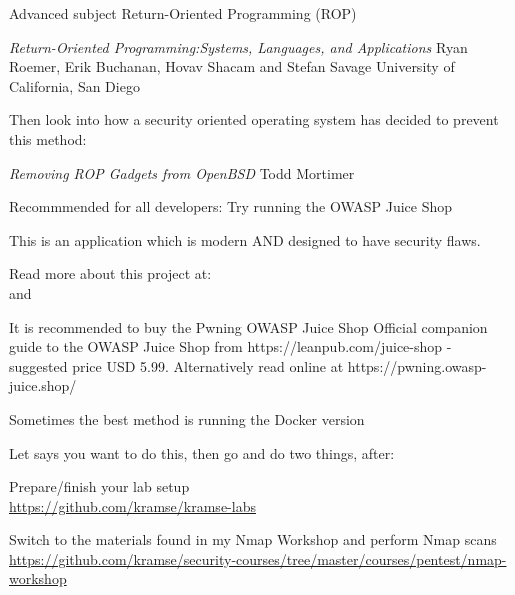 \documentclass[Screen16to9,17pt]{foils}
\begin{document}
\begin{list1}
\item Advanced subject Return-Oriented Programming (ROP)
\item \emph{Return-Oriented Programming:Systems, Languages, and Applications}
Ryan Roemer, Erik Buchanan, Hovav Shacam and Stefan Savage University of California, San Diego\\
\item Then look into how a security oriented operating system has decided to prevent this method:
\item \emph{Removing ROP Gadgets from OpenBSD}
Todd Mortimer\\
\end{list1}


\begin{list1}
\item Recommmended for all developers: Try running the OWASP Juice Shop
\item This is an application which is modern AND designed to have security flaws.
\item Read more about this project at:\\
 and\\ 
\item It is recommended to buy the Pwning OWASP Juice Shop Official companion guide to the OWASP Juice Shop from https://leanpub.com/juice-shop - suggested price USD 5.99. Alternatively read online at https://pwning.owasp-juice.shop/
\item Sometimes the best method is running the Docker version
\end{list1}



\begin{list2}
\item Let says you want to do this, then go and do two things, after:
\item Prepare/finish your lab setup\\
\url{https://github.com/kramse/kramse-labs}

\item Switch to the materials found in my Nmap Workshop and perform Nmap scans\\
\url{https://github.com/kramse/security-courses/tree/master/courses/pentest/nmap-workshop}
\end{list2}
\end{document}

